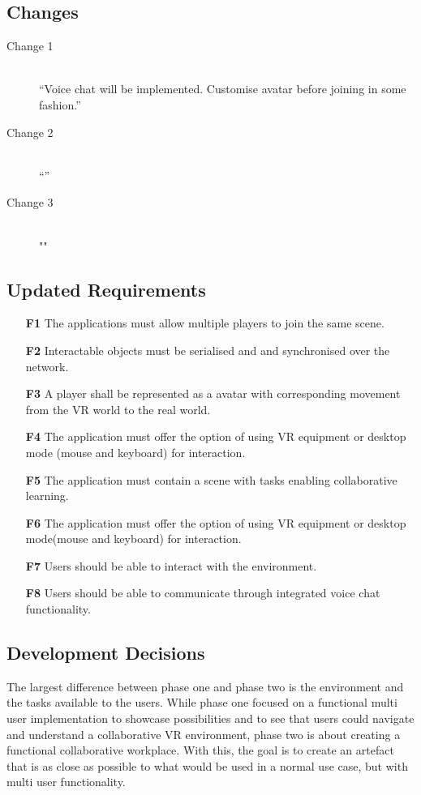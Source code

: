 \subsection{Changes}
\begin{description}
    \item [Change 1]\hfill \\
    “Voice chat will be implemented. Customise avatar before joining in some fashion.” 
    \item [Change 2]\hfill \\
    “”
    \item [Change 3]\hfill \\
    ""
\end{description}

\subsection{Updated Requirements}

\begin{enumerate}
  \setlength\itemsep{0em}
  \item [\textbf{F1}] The applications must allow multiple players to join the same scene.
  \item [\textbf{F2}] Interactable objects must be serialised and and synchronised over the network.
  \item [\textbf{F3}] A player shall be represented as a avatar with corresponding movement from the VR world to the real world.
  \item [\textbf{F4}] The application must offer the option of using VR equipment or desktop mode (mouse and keyboard) for interaction.
  \item [\textbf{F5}] The application must contain a scene with tasks enabling collaborative learning.
  \item [\textbf{F6}] The application must offer the option of using VR equipment or desktop mode(mouse and keyboard) for interaction.
  \item [\textbf{F7}] Users should be able to interact with the environment.
  \item [\textbf{F8}] Users should be able to communicate through integrated voice chat functionality.
\end{enumerate}

\subsection{Development Decisions}
The largest difference between phase one and phase two is the environment and the tasks available to the users. While phase one focused on a functional multi user implementation to showcase possibilities and to see that users could navigate and understand a collaborative VR environment, phase two is about creating a functional collaborative workplace. With this, the goal is to create an artefact that is as close as possible to what would be used in a normal use case, but with multi user functionality. 

